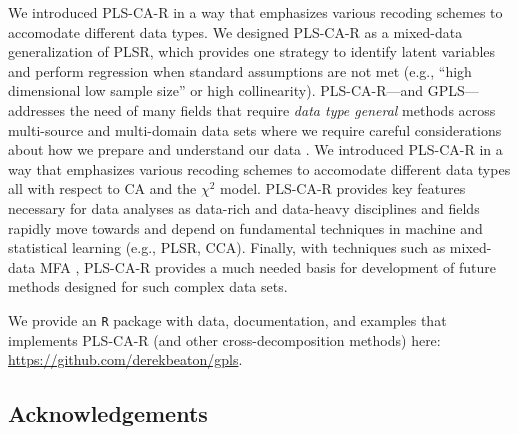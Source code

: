 \documentclass[12pt]{article}
\begin{document}
We introduced PLS-CA-R in a way that emphasizes various recoding schemes
to accomodate different data types. We designed PLS-CA-R as a mixed-data
generalization of PLSR, which provides one strategy to identify latent
variables and perform regression when standard assumptions are not met
(e.g., ``high dimensional low sample size'' or high collinearity).
PLS-CA-R---and GPLS---addresses the need of many fields that require
\textit{data type general} methods across multi-source and multi-domain
data sets where we require careful considerations about how we prepare
and understand our data \citep{nguyen2019ten}. We introduced PLS-CA-R in
a way that emphasizes various recoding schemes to accomodate different
data types all with respect to CA and the \(\chi^2\) model. PLS-CA-R
provides key features necessary for data analyses as data-rich and
data-heavy disciplines and fields rapidly move towards and depend on
fundamental techniques in machine and statistical learning (e.g., PLSR,
CCA). Finally, with techniques such as mixed-data MFA
\citep{becue-bertaut_multiple_2008}, PLS-CA-R provides a much needed
basis for development of future methods designed for such complex data
sets.

We provide an \texttt{R} package with data, documentation, and examples
that implements PLS-CA-R (and other cross-decomposition methods) here:
\url{https://github.com/derekbeaton/gpls}.

\hypertarget{acknowledgements}{%
\subsection{Acknowledgements}\label{acknowledgements}}
\end{document}
